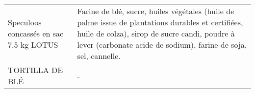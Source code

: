 \begin{longtable}{p{5cm}p{10cm}}
                                                                  Speculoos concassés en sac 7,5 kg LOTUS &                                                                                                                                                                                                                                                                                                                                                                                                                                                                                                                                                                                                                                                                                                                                                                                                                   Farine de blé, sucre, huiles végétales (huile de palme issue de plantations durables et certifiées, huile de colza), sirop de sucre candi, poudre à lever  (carbonate acide de sodium), farine de soja, sel, cannelle. \\
                                                                                          TORTILLA DE BLÉ &                                                                                                                                                                                                                                                                                                                                                                                                                                                                                                                                                                                                                                                                                                                                                                                                                                                                                                                                                                                                                                        - \\

\end{longtable}
